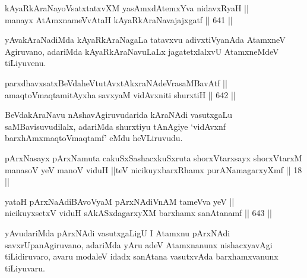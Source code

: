 \begin{shl}
kAyaRkAraNayoVsatxtatxvXM yasAmxdAtemxYva nidavxRyaH || \\
manayx AtAmxnameVvAtaH kAyaRkAraNavajajxgatf \hfill || 641 ||  
\end{shl}

\begin{artha}
yAvakAraNadiMda kAyaRkAraNagaLa tatavxvu adivxtiVyanAda AtamxneV
Agiruvano, adariMda kAyaRkAraNavuLaLx jagatetxlalxvU AtamxneMdeV tiLiyuvenu.
\end{artha}


\begin{shl}
parxdhavxsatxBeVdaheVtutAvxtAkxraNAdeVrasaMBavAtf || \\
amaqtoV\s maqtamitAyxha savxyaM vidAvxniti shurxtiH \hfill || 642 ||  
\end{shl}

\begin{artha}
BeVdakAraNavu nAshavAgiruvudarida kAraNAdi vasutxgaLu
saMBavisuvudilalx, adariMda shurxtiyu tAnAgiye `vidAvxnf
barxhAmxmaqtoV\s maqtamf' eMdu heVLiruvudu.
\end{artha}


\begin{shl}
pArxNasayx pArxNamuta cakuSxSashacxkuSxruta shorxVtarxsayx shorxVtarxM manasoV yeV manoV viduH ||teV nicikuyxbarxRhamx purANamagarxyXmf || 18 ||
\end{shl}


\begin{shl}
yataH pArxNaAdiBAvoV\s yaM pArxNAdiVnAM tameVva yeV || \\
nicikuyxsetxV viduH sAkASxdagarxyXM barxhamx sanAtanamf \hfill || 643 ||  
\end{shl}

\begin{artha}
yAvudariMda pArxNAdi vasutxgaLigU I Atamxnu pArxNAdi
savxrUpanAgiruvano, adariMda yAru adeV Atamxnanunx nishacxyavAgi
tiLidiruvaro, avaru modaleV idadx sanAtana vasutxvAda barxhamxvanunx
tiLiyuvaru.
\end{artha}

